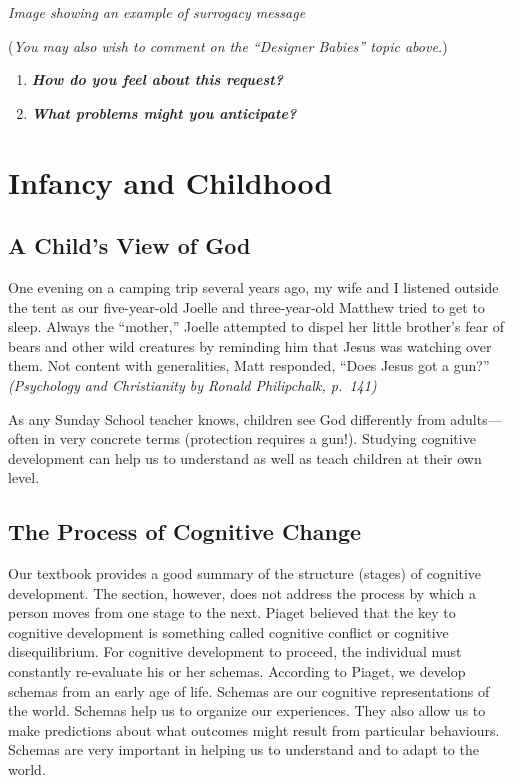 \documentclass[
]{book}
\providecommand{\tightlist}{%
  \setlength{\itemsep}{0pt}\setlength{\parskip}{0pt}}
\begin{document}
\emph{Image showing an example of surrogacy message }

(\emph{You may also wish to comment on the ``Designer Babies'' topic above.})

\begin{enumerate}
\def\labelenumi{\arabic{enumi}.}
\tightlist
\item
  \textbf{\emph{How do you feel about this request?}}
\item
  \textbf{\emph{What problems might you anticipate?}}
\end{enumerate}

\hypertarget{infancy-and-childhood}{%
\section{\texorpdfstring{\textbf{Infancy and Childhood}}{Infancy and Childhood}}\label{infancy-and-childhood}}

\hypertarget{a-childs-view-of-god}{%
\subsection*{A Child's View of God}\label{a-childs-view-of-god}}

One evening on a camping trip several years ago, my wife and I listened outside the tent as our five-year-old Joelle and three-year-old Matthew tried to get to sleep. Always the ``mother,'' Joelle attempted to dispel her little brother's fear of bears and other wild creatures by reminding him that Jesus was watching over them. Not content with generalities, Matt responded, ``Does Jesus got a gun?'' \emph{(Psychology and Christianity by Ronald Philipchalk, p.~141)}

As any Sunday School teacher knows, children see God differently from adults---often in very concrete terms (protection requires a gun!). Studying cognitive development can help us to understand as well as teach children at their own level.

\hypertarget{the-process-of-cognitive-change}{%
\subsection*{The Process of Cognitive Change}\label{the-process-of-cognitive-change}}

Our textbook provides a good summary of the structure (stages) of cognitive development. The section, however, does not address the process by which a person moves from one stage to the next. Piaget believed that the key to cognitive development is something called cognitive conflict or cognitive disequilibrium. For cognitive development to proceed, the individual must constantly re-evaluate his or her schemas. According to Piaget, we develop schemas from an early age of life. Schemas are our cognitive representations of the world. Schemas help us to organize our experiences. They also allow us to make predictions about what outcomes might result from particular behaviours. Schemas are very important in helping us to understand and to adapt to the world.
\end{document}
